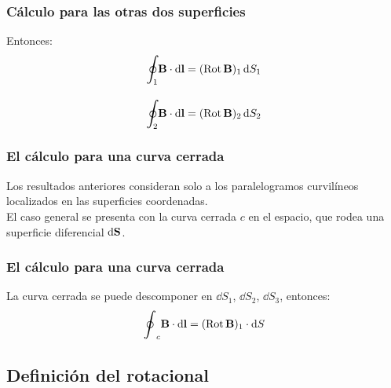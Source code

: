 \documentclass[12pt]{beamer}
\begin{document}
\begin{frame}
\frametitle{Cálculo para las otras dos superficies}
Entonces:
\pause
\begin{align*}
\scaleoint{6ex}_{\bs 1} \vb{B} \cdot \dd{\vb{l}} &= ({\rm{Rot}} \, \vb{B})_{1} \dd{S_{1}} \\[1em]
\scaleoint{6ex}_{\bs 2} \vb{B} \cdot \dd{\vb{l}} &= ({\rm{Rot}} \, \vb{B})_{2} \dd{S_{2}}
\end{align*}
\end{frame}
\begin{frame}
\frametitle{El cálculo para una curva cerrada}
Los resultados anteriores consideran solo a los paralelogramos curvilíneos localizados en las superficies coordenadas.
\\
\bigskip
\pause
El caso general se presenta con la curva cerrada $c$ en el espacio, que rodea una superficie diferencial $\dd{\vb{S}}$.
\end{frame}
\begin{frame}
\frametitle{El cálculo para una curva cerrada}
La curva cerrada se puede descomponer en $\dd{S_{1}}$, $\dd{S_{2}}$, $\dd{S_{3}}$, entonces:
\pause
\begin{align*}
\scaleoint{6ex}_{c} \vb{B} \cdot \dd{\vb{l}} = ({\rm{Rot}} \, \vb{B})_{1} \cdot \dd{S} 
\end{align*}
\end{frame}

\subsection{Definición del rotacional}
\end{document}

